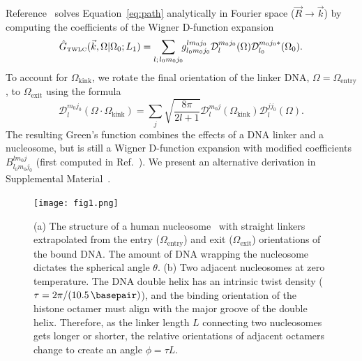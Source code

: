 \documentclass[%
 reprint,
superscriptaddress,
showpacs,preprintnumbers,
 amsmath,amssymb,
 aps,
 prl,
floatfix,
]{revtex4-1}
\newcommand{\ghat}[2][\Omega_0; L_1]{\hat{G}_\text{\tiny TWLC}(#2|#1)}
\newcommand{\wigD}{\mathcal{D}}
\begin{document}
Reference~\cite{spakowitz2006} solves Equation~\ref{eq:path} analytically in Fourier space
    ($\vec{R} \rightarrow \vec{k}$) by computing the coefficients of the Wigner D-function expansion
\begin{gather}\label{eq:expansion}
    \ghat{\vec{k}, \Omega} = \sum_{\substack{ l;\hspace{0.1em}l_0 m_0 j_0}} \!\!
    g_{l_0 m_{0} j_{0}}^{l m_0 j_0}
        \wigD_{l}^{m_0j_0}(\Omega)\wigD_{l_0}^{m_0 j_0 *}(\Omega_0).
\raisetag{0.5\baselineskip}
\end{gather}
To account for $\Omega_\text{kink}$, we rotate
    the final orientation of the linker DNA, ${\Omega = \Omega_\text{entry}}$, to
    $\Omega_\text{exit}$ using the formula
    \begin{equation}\label{eq:coeffs}
        \wigD_l^{m_0j_0}(\Omega \cdot \Omega_\text{kink}) = \sum_j \sqrt{\frac{8\pi}{2l+1}} \wigD_l^{m_0j}(\Omega_\text{kink}) \wigD_l^{jj_0}(\Omega).
    \end{equation}
The resulting Green's function combines the effects of a DNA linker and a nucleosome, but is still a Wigner D-function expansion with modified coefficients
$B_{l_{0} m_{0} j_{0}}^{l m_0 j}$
(first computed in Ref.~\cite{zhou2003}).
We present an alternative derivation in Supplemental Material~\cite{supplemental}.

\begin{figure}[t]
    \centering
    \texttt{[image: fig1.png]}%
    \caption{(a) The structure of a
        human nucleosome~\cite{wakamori2015} with straight linkers extrapolated
        from the entry ($\Omega_\text{entry}$) and exit ($\Omega_\text{exit}$)
        orientations of the bound DNA\@.
    The amount of DNA wrapping the nucleosome dictates the spherical angle
        $\theta$.
    (b) Two adjacent nucleosomes at zero
        temperature.
    The DNA double helix has an intrinsic twist density
        ($\tau=2\pi/(\SI{10.5}{\basepair})$), and the binding orientation of the
        histone octamer must align with the major groove of the double helix.
    Therefore, as the linker length $L$ connecting two nucleosomes gets
        longer or shorter, the relative orientations of adjacent octamers
        change to create an angle $\phi = \tau L$.
    }\label{fig:nuc-geo}
\end{figure}
\end{document}
